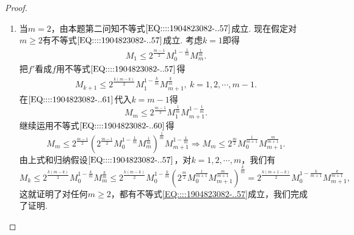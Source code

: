 \documentclass[../../main.tex]{subfiles}%
\begin{document}
\begin{proof}
\begin{enumerate}
\item 当\( m = 2 \)，由本题第二问知不等式\(\eqref{EQ::::1904823082-..57}\)成立. 现在假定对\( m \geqslant 2 \)有不等式\(\eqref{EQ::::1904823082-..57}\)成立. 考虑\( k = 1 \)即得
\begin{align}
M_1 \leqslant 2^{\frac{m - 1}{2}} M_0^{1 - \frac{1}{m}} M_m^{\frac{1}{m}}. \label{EQ::::1904823082-..60}
\end{align}
把\( f' \)看成\( f \)用不等式\(\eqref{EQ::::1904823082-..57}\)得
\begin{align}
M_{k + 1} \leqslant 2^{\frac{k(m - k)}{2}} M_1^{1 - \frac{k}{m}} M_{m + 1}^{\frac{k}{m}}, \ k = 1,2,\cdots, m - 1. \label{EQ::::1904823082-..61}
\end{align}
在\(\eqref{EQ::::1904823082-..61}\)代入\( k = m - 1 \)得
\[
M_m \leqslant 2^{\frac{m - 1}{2}} M_1^{\frac{1}{m}} M_{m + 1}^{1 - \frac{1}{m}}.
\]
继续运用不等式\(\eqref{EQ::::1904823082-..60}\)得
\[
M_m \leqslant 2^{\frac{m - 1}{2}} \left( 2^{\frac{m - 1}{2}} M_0^{1 - \frac{1}{m}} M_m^{\frac{1}{m}} \right)^{\frac{1}{m}} M_{m + 1}^{1 - \frac{1}{m}} \Rightarrow M_m \leqslant 2^{\frac{m}{2}} M_0^{\frac{1}{m + 1}} M_{m + 1}^{\frac{m}{m + 1}}.
\]
由上式和归纳假设\(\eqref{EQ::::1904823082-..57}\)，对\( k = 1,2,\cdots, m \)，我们有
\[
M_k \leqslant 2^{\frac{k(m - k)}{2}} M_0^{1 - \frac{k}{m}} M_m^{\frac{k}{m}} \leqslant 2^{\frac{k(m - k)}{2}} M_0^{1 - \frac{k}{m}} \left( 2^{\frac{m}{2}} M_0^{\frac{1}{m + 1}} M_{m + 1}^{\frac{m}{m + 1}} \right)^{\frac{k}{m}} = 2^{\frac{k(m + 1 - k)}{2}} M_0^{1 - \frac{k}{m + 1}} M_{m + 1}^{\frac{k}{m + 1}},
\]
这就证明了对任何\( m \geqslant 2 \)，都有不等式\eqref{EQ::::1904823082-..57}成立，我们完成了证明.
\end{enumerate}
\end{proof}
\end{document}
